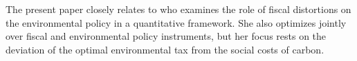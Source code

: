 The present paper closely relates to \cite{Barrage2019OptimalPolicy} who examines the role of fiscal distortions on the environmental policy in a quantitative framework. She also optimizes jointly over fiscal and environmental policy instruments, but her focus rests on the deviation of the optimal environmental tax from the social costs of carbon.
\begin{comment}
One of this paper's contributions is to discuss the existence of an upper bound on the reduction of distortionary income taxes: the weak double-dividend literature rests on the assumption that no lump-sum transfers and taxes are available. When this is the case, this paper shows that absent a government funding constraint, distortionary taxes should be set to reduce labor supply: some reduction in hours is in fact efficient from an environmental perspective. However, a shrinking labor supply is generally perceived as an inefficiency in this literature and environmental taxes on its own as efficient. The importance of lump-sum transfers to implement the efficient allocation receives less attention.  %


content...
\end{comment}



